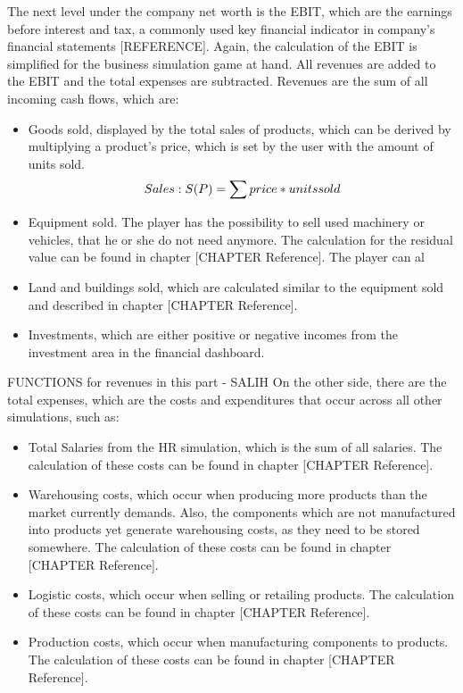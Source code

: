 The next level under the company net worth is the EBIT, which are the earnings before interest and tax, a commonly used key financial indicator in company's financial statements [REFERENCE]. Again, the calculation of the EBIT is simplified for the business simulation game at hand. All revenues are added to the EBIT and the total expenses are subtracted. Revenues are the sum of all incoming cash flows, which are:
\begin{itemize}
    \item Goods sold, displayed by the total sales of products, which can be derived by multiplying a product’s price, which is set by the user with the amount of units sold.
    \begin{equation}
        Sales: S(P) = \sum price\index{Product} * units sold
    \end{equation}
    \item Equipment sold. The player has the possibility to sell used machinery or vehicles, that he or she do not need anymore. The calculation for the residual value can be found in chapter [CHAPTER Reference]. The player can al
    \item Land and buildings sold, which are calculated similar to the equipment sold and described in chapter [CHAPTER Reference].
    \item Investments, which are either positive or negative incomes from the investment area in the financial dashboard.
\end{itemize}

FUNCTIONS for revenues in this part - SALIH
On the other side, there are the total expenses, which are the costs and expenditures that occur across all other simulations, such as:
\begin{itemize}
    \item Total Salaries from the HR simulation, which is the sum of all salaries. The calculation of these costs can be found in chapter [CHAPTER Reference].
    \item Warehousing costs, which occur when producing more products than the market currently demands. Also, the components which are not manufactured into products yet generate warehousing costs, as they need to be stored somewhere. The calculation of these costs can be found in chapter [CHAPTER Reference]. 
    \item Logistic costs, which occur when selling or retailing products. The calculation of these costs can be found in chapter [CHAPTER Reference].
    \item Production costs, which occur when manufacturing components to products. The calculation of these costs can be found in chapter [CHAPTER Reference].
\end{itemize}

